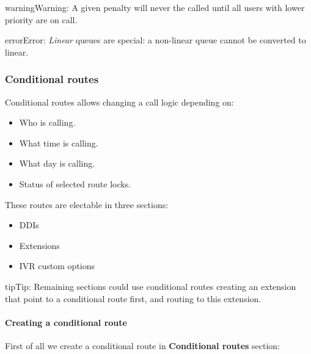 \documentclass[letterpaper,10pt,english]{sphinxmanual}
\begin{document}
\begin{notice}{warning}{Warning:}
A given penalty will never the called until all users with lower priority are on call.
\end{notice}

\begin{notice}{error}{Error:}
\emph{Linear} queues are special: a non-linear queue cannot be converted to linear.
\end{notice}


\subsubsection{Conditional routes}
\label{administration_portal/client/vpbx/routing_endpoints/conditional_routes::doc}\label{administration_portal/client/vpbx/routing_endpoints/conditional_routes:conditional-routes}\label{administration_portal/client/vpbx/routing_endpoints/conditional_routes:id1}
Conditional routes allows changing a call logic depending on:
\begin{itemize}
\item {} 
Who is calling.

\item {} 
What time is calling.

\item {} 
What day is calling.

\item {} 
Status of selected route locks.

\end{itemize}

These routes are electable in three sections:
\begin{itemize}
\item {} 
DDIs

\item {} 
Extensions

\item {} 
IVR custom options

\end{itemize}

\begin{notice}{tip}{Tip:}
Remaining sections could use conditional routes creating an extension
that point to a conditional route first, and routing to this extension.
\end{notice}


\paragraph{Creating a conditional route}
\label{administration_portal/client/vpbx/routing_endpoints/conditional_routes:creating-a-conditional-route}
First of all we create a conditional route in \textbf{Conditional routes} section:
\end{document}
